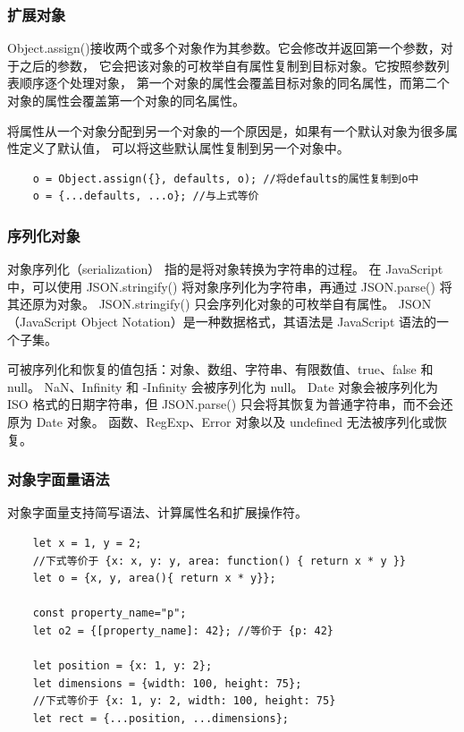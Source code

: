 \subsubsection{扩展对象}
Object.assign()接收两个或多个对象作为其参数。它会修改并返回第一个参数，对于之后的参数，
它会把该对象的可枚举自有属性复制到目标对象。它按照参数列表顺序逐个处理对象，
第一个对象的属性会覆盖目标对象的同名属性，而第二个对象的属性会覆盖第一个对象的同名属性。

将属性从一个对象分配到另一个对象的一个原因是，如果有一个默认对象为很多属性定义了默认值，
可以将这些默认属性复制到另一个对象中。
\begin{verbatim}
    o = Object.assign({}, defaults, o); //将defaults的属性复制到o中
    o = {...defaults, ...o}; //与上式等价
\end{verbatim}

\subsubsection{序列化对象}
对象序列化（serialization） 指的是将对象转换为字符串的过程。
在 JavaScript 中，可以使用 JSON.stringify() 将对象序列化为字符串，再通过 JSON.parse() 将其还原为对象。
JSON.stringify() 只会序列化对象的可枚举自有属性。
JSON（JavaScript Object Notation）是一种数据格式，其语法是 JavaScript 语法的一个子集。

可被序列化和恢复的值包括：对象、数组、字符串、有限数值、true、false 和 null。
NaN、Infinity 和 -Infinity 会被序列化为 null。
Date 对象会被序列化为 ISO 格式的日期字符串，但 JSON.parse() 只会将其恢复为普通字符串，而不会还原为 Date 对象。
函数、RegExp、Error 对象以及 undefined 无法被序列化或恢复。

\subsubsection{对象字面量语法}
对象字面量支持简写语法、计算属性名和扩展操作符。
\begin{verbatim}
    let x = 1, y = 2;
    //下式等价于 {x: x, y: y, area: function() { return x * y }}
    let o = {x, y, area(){ return x * y}}; 

    const property_name="p";
    let o2 = {[property_name]: 42}; //等价于 {p: 42}

    let position = {x: 1, y: 2};
    let dimensions = {width: 100, height: 75};
    //下式等价于 {x: 1, y: 2, width: 100, height: 75}
    let rect = {...position, ...dimensions}; 
\end{verbatim}

